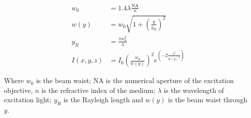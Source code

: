 \begin{align}
  w_0 &= 1.4 \lambda \frac{ \text{NA}}{n}\\
  w(y) &= w_0 \sqrt{1+{\left(\frac{y}{y_R}\right)}^2}\\
  y_R &= \frac{\pi w_0^2}{\lambda}\\
  I(x,y,z) &= I_0 {\left(\frac{w_0}{w(y)}\right)}^2 e^{\left(-2\frac{z^2}{{w(y)}^2}\right)}
\end{align}

Where \(w_0\) is the beam waist; NA is the numerical aperture of the excitation objective, \(n\) is the refractive index of the medium; \(\lambda \) is the wavelength of excitation light; \(y_R\) is the Rayleigh length and \(w(y)\) is the beam waist through \(y\).


